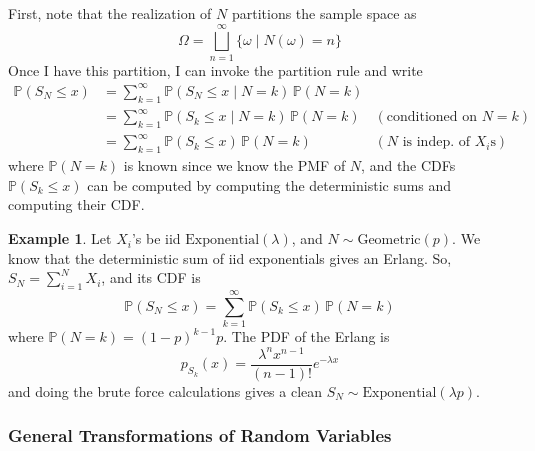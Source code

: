 \documentclass{article}
\theoremstyle{definition}
\newtheorem{example}{Example}[section]
\theoremstyle{remark}
\theoremstyle{definition}
\begin{document}
First, note that the realization of $N$ partitions the sample space as 
\[\Omega = \bigsqcup_{n = 1}^\infty \{\omega \mid N(\omega) = n\}\]
Once I have this partition, I can invoke the partition rule and write 
\begin{align*}
    \mathbb{P}(S_N \leq x) & = \sum_{k=1}^\infty \mathbb{P}(S_N \leq x \mid N = k) \, \mathbb{P}(N = k) \\
    & = \sum_{k=1}^\infty \mathbb{P}(S_k \leq x \mid N = k) \, \mathbb{P}(N = k) & (\text{conditioned on } N = k) \\
    & = \sum_{k=1}^\infty \mathbb{P}(S_k \leq x) \, \mathbb{P}(N = k) & (N \text{ is indep. of } X_i \text{s})
\end{align*}
where $\mathbb{P}(N = k)$ is known since we know the PMF of $N$, and the CDFs $\mathbb{P}(S_k \leq x)$ can be computed by computing the deterministic sums and computing their CDF. 

\begin{example}
Let $X_i$'s be iid $\mathrm{Exponential}(\lambda)$, and $N \sim \mathrm{Geometric}(p)$. We know that the deterministic sum of iid exponentials gives an Erlang. So, $S_N = \sum_{i=1}^N X_i$, and its CDF is 
\[\mathbb{P}(S_N \leq x) = \sum_{k=1}^\infty \mathbb{P}(S_k \leq x) \, \mathbb{P}(N = k)\]
where $\mathbb{P}(N = k) = (1 - p)^{k - 1} p$. The PDF of the Erlang is 
\[p_{S_k} (x) = \frac{\lambda^n x^{n-1}}{(n - 1)!} e^{-\lambda x}\]
and doing the brute force calculations gives a clean $S_N \sim \mathrm{Exponential}(\lambda p)$. 
\end{example}

\subsubsection{General Transformations of Random Variables}
\end{document}
